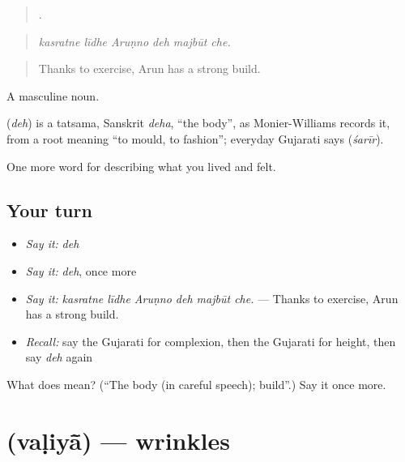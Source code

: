 \begin{quote}
     .
\end{quote}

\begin{quote}
\emph{kasratne līdhe Aruṇno deh majbūt che.}
\end{quote}

\begin{quote}
Thanks to exercise, Arun has a strong build.
\end{quote}

A masculine noun.

\begin{cousinweb}
\textbf{} (\emph{deh}) is a tatsama, Sanskrit \emph{deha}, \textquotedblleft{}the body\textquotedblright{}, as Monier-Williams records it, from a root meaning \textquotedblleft{}to mould, to fashion\textquotedblright{}; everyday Gujarati says \textbf{} (\emph{śarīr}).
\end{cousinweb}

\begin{grammarlens}[title={What you've built}]
One more word for describing what you lived and felt.
\end{grammarlens}

\subsection*{Your turn}
\begin{itemize}
\raggedright
  \item \emph{Say it:} \emph{deh}
  \item \emph{Say it:} \emph{deh}, once more
  \item \emph{Say it:} \emph{kasratne līdhe Aruṇno deh majbūt che.} — Thanks to exercise, Arun has a strong build.
  \item \emph{Recall:} say the Gujarati for complexion, then the Gujarati for height, then say \emph{deh} again
\end{itemize}

\begin{tcolorbox}[breakable,colback=teal!4,colframe=teal!35!black,title={Before you move on}]
What does  mean? (\textquotedblleft{}The body (in careful speech); build\textquotedblright{}.) Say it once more.
\end{tcolorbox}
\section[\texorpdfstring{\gu{વળિયાં} (vaḷiyā̃)}{વળિયાં (vaḷiyā̃)}]{ (vaḷiyā̃) — wrinkles}


